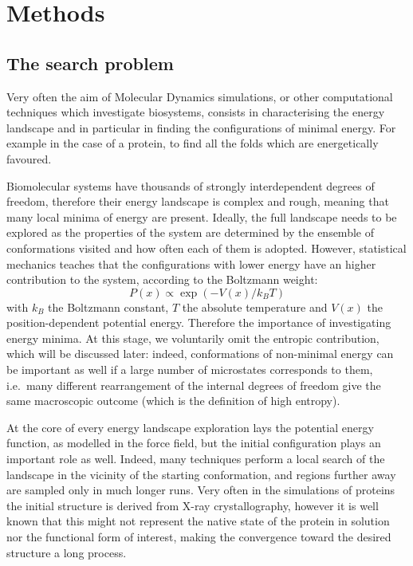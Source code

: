 \chapter{Methods} \label{chapter:MD}

\section{The search problem} \label{sec:search}

Very often the aim of Molecular Dynamics simulations, or other computational techniques which investigate biosystems, consists in characterising the energy landscape and in particular in finding the configurations of minimal energy. For example in the case of a protein, to find all the folds which are energetically favoured.

Biomolecular systems have thousands of strongly interdependent degrees of freedom, therefore their energy landscape is complex and rough, meaning that many local minima of energy are present. Ideally, the full landscape needs to be explored as the properties of the system are determined by the ensemble of conformations visited and how often each of them is adopted. However, statistical mechanics teaches that the configurations with lower energy have an higher contribution to the system, according to the Boltzmann weight:
\begin{equation}
P(x) \propto \exp(-V(x)/k_BT)
\end{equation}
with $k_B$ the Boltzmann constant, $T$ the absolute temperature and $V(x)$ the position-dependent potential energy. Therefore the importance of investigating energy minima.
%
At this stage, we voluntarily omit the entropic contribution, which will be discussed later: indeed, conformations of non-minimal energy can be important as well if a large number of microstates corresponds to them, i.e.\ many different rearrangement of the internal degrees of freedom give the same macroscopic outcome (which is the definition of high entropy).

At the core of every energy landscape exploration lays the potential energy function, as modelled in the force field, but the initial configuration plays an important role as well.
%
Indeed, many techniques perform a local search of the landscape in the vicinity of the starting conformation, and regions further away are sampled only in much longer runs. Very often in the simulations of proteins the initial structure is derived from X-ray crystallography, however it is well known that this might not represent the native state of the protein in solution nor the functional form of interest, making the convergence toward the desired structure a long process.

